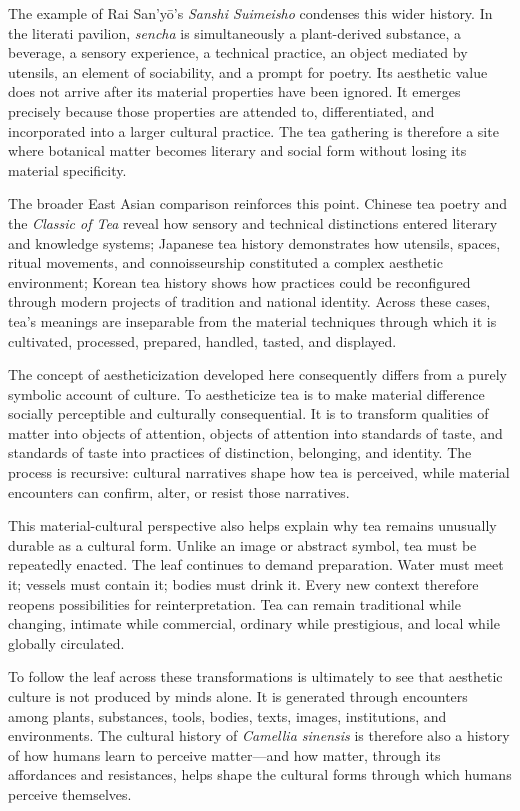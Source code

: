 \documentclass[numbers]{IntechOpen-Book}
\begin{document}
The example of Rai San'yō's \textit{Sanshi Suimeisho} condenses this wider history. In the literati pavilion, \textit{sencha} is simultaneously a plant-derived substance, a beverage, a sensory experience, a technical practice, an object mediated by utensils, an element of sociability, and a prompt for poetry. Its aesthetic value does not arrive after its material properties have been ignored. It emerges precisely because those properties are attended to, differentiated, and incorporated into a larger cultural practice. The tea gathering is therefore a site where botanical matter becomes literary and social form without losing its material specificity.

The broader East Asian comparison reinforces this point. Chinese tea poetry and the \textit{Classic of Tea} reveal how sensory and technical distinctions entered literary and knowledge systems; Japanese tea history demonstrates how utensils, spaces, ritual movements, and connoisseurship constituted a complex aesthetic environment; Korean tea history shows how practices could be reconfigured through modern projects of tradition and national identity. Across these cases, tea's meanings are inseparable from the material techniques through which it is cultivated, processed, prepared, handled, tasted, and displayed.

The concept of aestheticization developed here consequently differs from a purely symbolic account of culture. To aestheticize tea is to make material difference socially perceptible and culturally consequential. It is to transform qualities of matter into objects of attention, objects of attention into standards of taste, and standards of taste into practices of distinction, belonging, and identity. The process is recursive: cultural narratives shape how tea is perceived, while material encounters can confirm, alter, or resist those narratives.

This material-cultural perspective also helps explain why tea remains unusually durable as a cultural form. Unlike an image or abstract symbol, tea must be repeatedly enacted. The leaf continues to demand preparation. Water must meet it; vessels must contain it; bodies must drink it. Every new context therefore reopens possibilities for reinterpretation. Tea can remain traditional while changing, intimate while commercial, ordinary while prestigious, and local while globally circulated.

To follow the leaf across these transformations is ultimately to see that aesthetic culture is not produced by minds alone. It is generated through encounters among plants, substances, tools, bodies, texts, images, institutions, and environments. The cultural history of \textit{Camellia sinensis} is therefore also a history of how humans learn to perceive matter---and how matter, through its affordances and resistances, helps shape the cultural forms through which humans perceive themselves.
\end{document}
